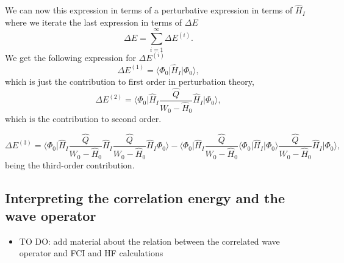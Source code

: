 \documentclass[%
twoside,                 %
final,                   %
10pt]{article}
\begin{document}
We can now this expression in terms of a perturbative expression in terms
of $\hat{H}_I$ where we iterate the last expression in terms of $\Delta E$
\[
\Delta E=\sum_{i=1}^{\infty}\Delta E^{(i)}.
\]
We get the following expression for $\Delta E^{(i)}$
\[
\Delta E^{(1)}=\langle \Phi_0\vert \hat{H}_I\vert \Phi_0\rangle,
\] 
which is just the contribution to first order in perturbation theory,
\[
\Delta E^{(2)}=\langle\Phi_0\vert \hat{H}_I\frac{\hat{Q}}{W_0-\hat{H}_0}\hat{H}_I\vert \Phi_0\rangle, 
\]
which is the contribution to second order.



\[
\Delta E^{(3)}=\langle \Phi_0\vert \hat{H}_I\frac{\hat{Q}}{W_0-\hat{H}_0}\hat{H}_I\frac{\hat{Q}}{W_0-\hat{H}_0}\hat{H}_I\Phi_0\rangle-
\langle\Phi_0\vert \hat{H}_I\frac{\hat{Q}}{W_0-\hat{H}_0}\langle \Phi_0\vert \hat{H}_I\vert \Phi_0\rangle\frac{\hat{Q}}{W_0-\hat{H}_0}\hat{H}_I\vert \Phi_0\rangle,
\]
being the third-order contribution. 


\subsection*{Interpreting the correlation energy and the wave operator}
\begin{itemize}
\item TO DO: add material about the relation between the correlated wave operator and FCI and HF calculations
\end{itemize}

\noindent



\printindex
\end{document}
